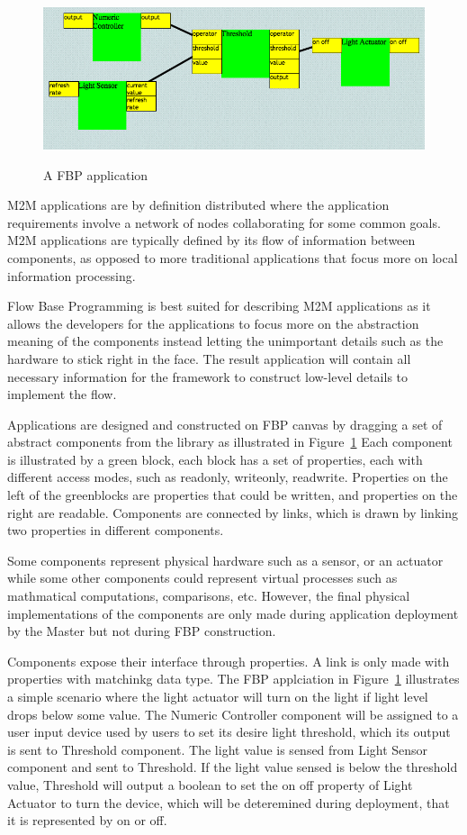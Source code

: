 \begin{figure}[h!]
\caption{A FBP application}
\centering
    \includegraphics[width=\linewidth]{figures/fbp-application}
\label{fig:fbp-application}
\end{figure}

M2M applications are by definition distributed where the application
requirements involve a network of nodes collaborating for some common 
goals. M2M applications are typically defined by its flow of information
between components, as opposed to more traditional applications that focus more
on local information processing.

Flow Base Programming is best suited for describing M2M applications as it
allows the developers for the applications to focus more on the
abstraction meaning of the components instead letting the unimportant details
such as the hardware to stick right in the face. The result application will
contain all necessary information for the framework to construct low-level
details to implement the flow.

Applications are designed and constructed on FBP canvas by dragging a set of
abstract components from the library as illustrated in Figure~\ref{fig:fbp-application} 
Each component is
illustrated by a green block, each block has a set of properties, each with
different access modes, such as readonly, writeonly, readwrite. Properties on
the left of the greenblocks are properties that could be written, and
properties on the right are readable. Components are connected by links, which
is drawn by linking two properties in different components.

Some components represent physical hardware such as a sensor, or an actuator
while some other components could represent virtual processes such as
mathmatical computations, comparisons, etc. However, the final physical implementations
of the components are only made during application deployment by the Master but
not during FBP construction.

Components expose their interface through properties. A link is only made with
properties with matchinkg data type. The FBP applciation in
Figure~\ref{fig:fbp-application} illustrates a simple scenario where the light actuator
will turn on the light if light level drops below some value. The Numeric
Controller component will be assigned to a user input device used by users to
set its desire light threshold, which its output is sent to Threshold
component. The light value is sensed from Light Sensor component and sent to
Threshold. If the light value sensed is below the threshold value, Threshold
will output a boolean to set the on off property of Light Actuator to turn the
device, which will be deteremined during deployment, that it is represented by
on or off.

